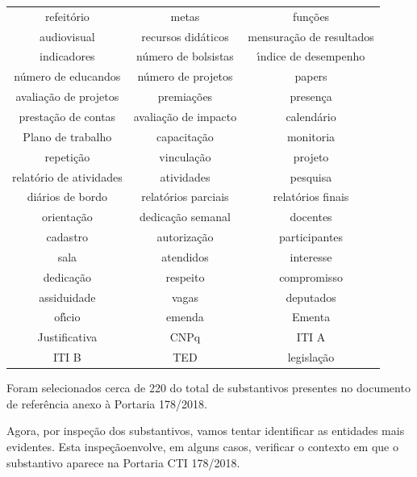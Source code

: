 \documentclass[
12pt,		%
openright,	%
twoside,  %
a4paper,			%
chapter=TITLE,		%
english,			%
french,				%
spanish,			%
brazil				%
]{USPSC-classe/USPSC}
\begin{document}
\begin{table}[htb]
\begin{tabular}{|c|c|c|}
refeit\'orio  &  metas  &  fun\c{c}\~oes \\
audiovisual  &  recursos did\'aticos  &  mensura\c{c}\~ao de resultados \\
indicadores  &  n\'umero de bolsistas  &  \'{\i}ndice de desempenho \\
n\'umero de educandos  &  n\'umero de projetos  &  papers \\
avalia\c{c}\~ao de projetos  &  premia\c{c}\~oes  &  presen\c{c}a  \\
presta\c{c}\~ao de contas  &  avalia\c{c}\~ao de impacto  &  calend\'ario \\
Plano de trabalho  &  capacita\c{c}\~ao  &  monitoria \\
repeti\c{c}\~ao  &  vincula\c{c}\~ao  &  projeto \\
relat\'orio de atividades  &  atividades  &  pesquisa \\
di\'arios de bordo  &  relat\'orios parciais  &  relat\'orios finais \\
orienta\c{c}\~ao  &  dedica\c{c}\~ao semanal  &  docentes \\
cadastro  &  autoriza\c{c}\~ao  &  participantes \\
sala  &  atendidos  &  interesse \\
dedica\c{c}\~ao  &  respeito  &  compromisso \\
assiduidade  &  vagas  &  deputados \\
of\'{\i}cio  &  emenda  &  Ementa \\
Justificativa  &  CNPq  &  ITI A \\
ITI B  &  TED  &  legisla\c{c}\~ao \\
\hline
\end{tabular}
\end{table}


Foram selecionados cerca de 220 do total de substantivos presentes no documento de refer\^encia anexo \`a Portaria 178/2018.










Agora, por inspe\c{c}\~ao dos substantivos, vamos tentar identificar as entidades mais evidentes. Esta \textquotedbl inspe\c{c}\~ao\textquotedbl  envolve, em alguns casos, verificar o contexto em que o substantivo aparece na Portaria CTI 178/2018.
\end{document}
